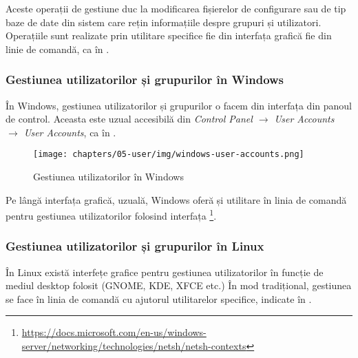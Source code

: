 Aceste operații de gestiune duc la modificarea fișierelor de configurare sau de tip baze de date din sistem care rețin informațiile despre grupuri și utilizatori.
Operațiile sunt realizate prin utilitare specifice fie din interfața grafică fie din linie de comandă, ca în .

\subsubsection{Gestiunea utilizatorilor și grupurilor în Windows}
\label{sec:user:user-group-windows}

În Windows, gestiunea utilizatorilor și grupurilor o facem din interfața din panoul de control.
Aceasta este uzual accesibilă din \textit{Control Panel $\rightarrow$ User Accounts $\rightarrow$ User Accounts}, ca în .

\begin{figure}[!htbp]
  \centering
  \texttt{[image: chapters/05-user/img/windows-user-accounts.png]}
  \caption{Gestiunea utilizatorilor în Windows}
  \label{fig:user:windows-users}
\end{figure}

Pe lângă interfața grafică, uzuală, Windows oferă și utilitare în linia de comandă pentru gestiunea utilizatorilor folosind interfața \footnote{\url{https://docs.microsoft.com/en-us/windows-server/networking/technologies/netsh/netsh-contexts}}.

\subsubsection{Gestiunea utilizatorilor și grupurilor în Linux}
\label{sec:user:user-group-linux}

În Linux există interfețe grafice pentru gestiunea utilizatorilor în funcție de mediul desktop folosit (GNOME, KDE, XFCE etc.) În mod tradițional, gestiunea se face în linia de comandă cu ajutorul utilitarelor specifice, indicate în .

